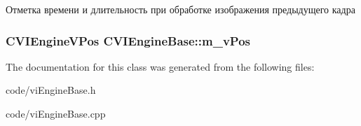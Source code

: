 Отметка времени и длительность при обработке изображения предыдущего кадра 

\hypertarget{class_c_v_i_engine_base_afab397345881a9b8a44e6f8eae9805f0}{
\subsubsection[{m\+\_\+v\+Pos}]{\setlength{\rightskip}{0pt plus 5cm}C\+V\+I\+Engine\+V\+Pos C\+V\+I\+Engine\+Base\+::m\+\_\+v\+Pos}}\label{class_c_v_i_engine_base_afab397345881a9b8a44e6f8eae9805f0}






The documentation for this class was generated from the following files\+:\begin{DoxyCompactItemize}
\item 
code/vi\+Engine\+Base.\+h\item 
code/vi\+Engine\+Base.\+cpp\end{DoxyCompactItemize}
